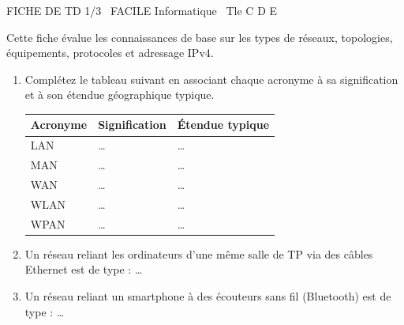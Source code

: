\documentclass[11pt]{article}
\begin{document}
\begin{tcolorbox}[enhanced,colback=popink,colframe=popink,arc=10pt,boxrule=0pt,left=12pt,right=12pt,top=9pt,bottom=9pt]
{\color{white}\popxbold\small FICHE DE TD 1/3 \textbullet\ FACILE \hfill Informatique \textbullet\ Tle C D E\par}
\end{tcolorbox}
\vspace{4pt}
Cette fiche évalue les connaissances de base sur les types de réseaux, topologies, équipements, protocoles et adressage IPv4.

\begin{exercice}
\begin{enumerate}
    \item Complétez le tableau suivant en associant chaque acronyme à sa signification et à son étendue géographique typique.
    \begin{tabular}{|l|l|l|}
    \hline
    \textbf{Acronyme} & \textbf{Signification} & \textbf{Étendue typique} \\
    \hline
    LAN & \ldots & \ldots \\
    \hline
    MAN & \ldots & \ldots \\
    \hline
    WAN & \ldots & \ldots \\
    \hline
    WLAN & \ldots & \ldots \\
    \hline
    WPAN & \ldots & \ldots \\
    \hline
    \end{tabular}
    \item Un réseau reliant les ordinateurs d'une même salle de TP via des câbles Ethernet est de type : \ldots
    \item Un réseau reliant un smartphone à des écouteurs sans fil (Bluetooth) est de type : \ldots
\end{enumerate}
\end{exercice}
\end{document}
